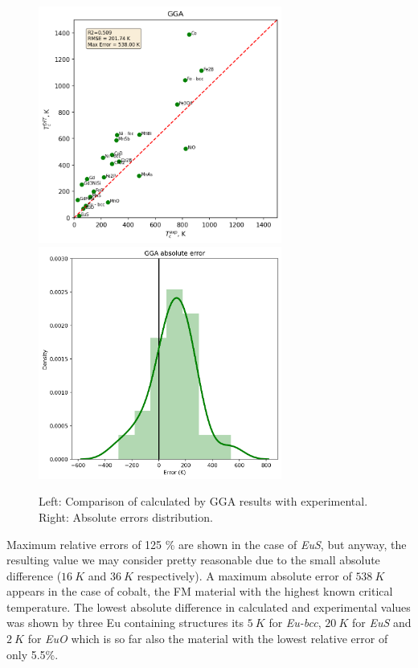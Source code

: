 \begin{figure}[H]
\centering
\captionsetup{justification=centering,margin=2cm}
	\includegraphics[width=80mm]{fig/dft_fig/gga_results.png}\includegraphics[width=80mm]{fig/dft_fig/gga_err.png}
	\caption[Comparison of calculated by GGA results with experimental.]{Left: Comparison of calculated by GGA results with experimental. Right: Absolute errors distribution.}
\label{fig:gga}
\end{figure}

 Maximum relative errors of  125 \% are shown in the case of \textit{EuS}, but anyway, the resulting value we may consider pretty reasonable due to the small absolute difference ($16\ K$ and $36\ K$ respectively).  A maximum absolute error of $538\ K$ appears in the case of cobalt, the FM material with the highest known critical temperature.  The lowest absolute difference in calculated and experimental values was shown by three Eu containing structures its $5\ K$ for \textit{Eu-bcc}, $20\ K$ for \textit{EuS} and $2\ K$ for \textit{EuO} which is so far also the material with the lowest relative error of only 5.5\%.



